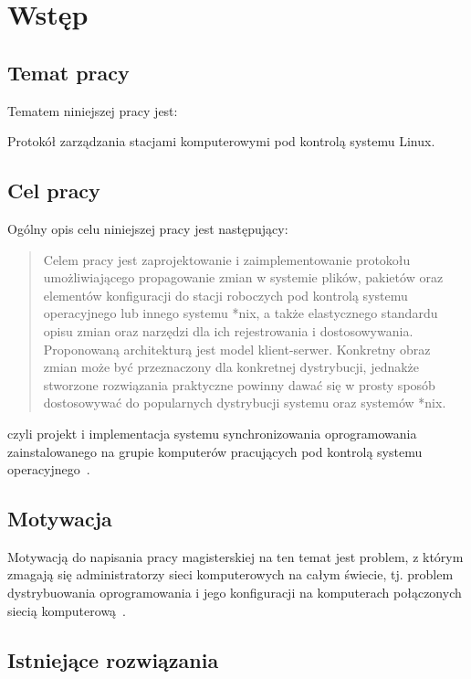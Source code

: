 \documentclass[praca_magisterska]{subfiles}
\begin{document}
\chapter{Wstęp}

\section{Temat pracy}

Tematem niniejszej pracy jest:
\begin{displayquote}
Protokół zarządzania stacjami komputerowymi pod kontrolą systemu Linux.
\end{displayquote}

\section{Cel pracy}

Ogólny opis celu niniejszej pracy jest następujący:
\blockcquote{formularz-zgloszenia-pracy}{Celem pracy jest zaprojektowanie i zaimplementowanie protokołu umożliwiającego propagowanie zmian w systemie plików, pakietów oraz elementów konfiguracji do stacji roboczych pod kontrolą systemu operacyjnego  lub innego systemu *nix, a także elastycznego standardu opisu zmian oraz narzędzi dla ich rejestrowania i dostosowywania. Proponowaną architekturą jest model klient-serwer. Konkretny obraz zmian może być przeznaczony dla konkretnej dystrybucji, jednakże stworzone rozwiązania praktyczne powinny dawać się w prosty sposób dostosowywać do popularnych dystrybucji systemu  oraz systemów *nix.}
czyli projekt i implementacja systemu synchronizowania oprogramowania zainstalowanego na grupie komputerów pracujących pod kontrolą systemu operacyjnego~\texttt{}.

\section{Motywacja}

Motywacją do napisania pracy magisterskiej na ten temat jest problem, z którym zmagają się administratorzy sieci komputerowych na całym świecie, tj. problem dystrybuowania oprogramowania i jego konfiguracji na komputerach połączonych siecią komputerową~\cite{so-problem-intro}.

\section{Istniejące rozwiązania}
\end{document}
